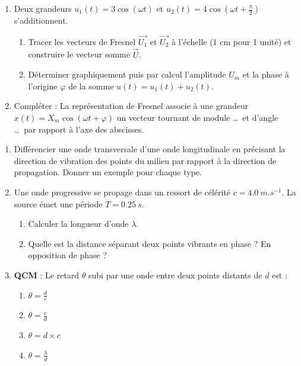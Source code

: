 \documentclass[11pt]{article}
\begin{document}
\begin{exercice}
\begin{enumerate}
    \item Deux grandeurs $u_1(t) = 3\cos(\omega t)$ et $u_2(t) = 4\cos(\omega t + \frac{\pi}{2})$ s'additionnent. 
    \begin{enumerate}
        \item Tracer les vecteurs de Fresnel $\overrightarrow{U_1}$ et $\overrightarrow{U_2}$ à l'échelle (1 cm pour 1 unité) et construire le vecteur somme $\overrightarrow{U}$.
        \item Déterminer graphiquement puis par calcul l'amplitude $U_m$ et la phase à l'origine $\varphi$ de la somme $u(t) = u_1(t) + u_2(t)$.
    \end{enumerate}
    \item Compléter : La représentation de Fresnel associe à une grandeur $x(t)=X_m\cos(\omega t + \varphi)$ un vecteur tournant de module \dots\ et d'angle \dots\ par rapport à l'axe des abscisses.
\end{enumerate}
\end{exercice}

\begin{exercice}
\begin{enumerate}
    \item Différencier une onde transversale d'une onde longitudinale en précisant la direction de vibration des points du milieu par rapport à la direction de propagation. Donner un exemple pour chaque type.
    \item Une onde progressive se propage dans un ressort de célérité $c = \SI{4,0}{m.s^{-1}}$. La source émet une période $T = \SI{0,25}{s}$.
    \begin{enumerate}
        \item Calculer la longueur d'onde $\lambda$.
        \item Quelle est la distance séparant deux points vibrants en phase ? En opposition de phase ?
    \end{enumerate}
    \item \textbf{QCM} : Le retard $\theta$ subi par une onde entre deux points distants de $d$ est :
    \begin{enumerate}
        \item $\theta = \frac{d}{c}$ \quad \item $\theta = \frac{c}{d}$ \quad \item $\theta = d \times c$ \quad \item $\theta = \frac{\lambda}{d}$
    \end{enumerate}
\end{enumerate}
\end{exercice}
\end{document}
